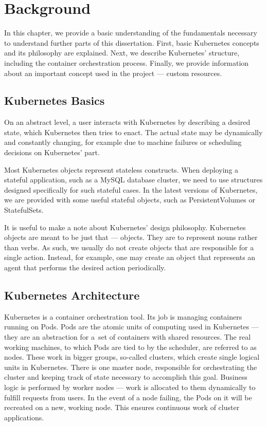 \chapter{Background}

In this chapter, we provide a basic understanding of the fundamentals necessary to understand
further parts of this dissertation. First, basic Kubernetes concepts and its philosophy are
explained. Next, we describe Kubernetes’ structure, including the container orchestration process.
Finally, we provide information about an important concept used in the project --- custom resources.

\section{Kubernetes Basics}
On an abstract level, a user interacts with Kubernetes by describing a desired state, which
Kubernetes then tries to enact. The actual state may be dynamically and constantly changing, for
example due to machine failures or scheduling decisions on Kubernetes' part.

Most Kubernetes objects represent stateless constructs. When deploying a stateful application, such as a
MySQL database cluster, we need to use structures designed specifically for such stateful cases. In
the latest versions of Kubernetes, we are provided with some useful stateful objects, such as
PersistentVolumes or StatefulSets.

It is useful to make a note about Kubernetes’ design philosophy.
Kubernetes objects are meant to be just that --- objects. They are to represent nouns rather than
verbs. As such, we usually do not create objects that are responsible for a single action. Instead,
for example, one may create an object that represents an agent that performs the desired action
periodically.

\section{Kubernetes Architecture}

Kubernetes is a container orchestration tool. Its job is managing containers running on Pods. Pods
are the atomic units of computing used in Kubernetes --- they are an abstraction for a~set of
containers with shared resources. The real working machines, to which Pods are tied to by the
scheduler, are referred to as nodes. These work in bigger groups, so-called clusters, which
create single logical units in Kubernetes. There is one master node, responsible for orchestrating
the cluster and keeping track of state necessary to accomplish this goal. Business logic is
performed by worker nodes --- work is allocated to them dynamically to fulfill requests from users.
In the event of a node failing, the Pods on it will be recreated on a new,
working node. This ensures continuous work of cluster applications.

